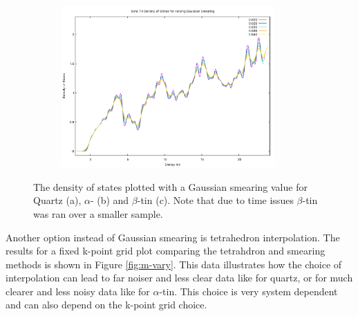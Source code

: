 \documentclass[12pt]{article}
\begin{document}
\begin{figure}[h!!!!!]
	\\
	\begin{subfigure}[t]{0.5\textwidth}
		\includegraphics[width=8.2cm]{beta-dos-data/beta-smear-vary-dos.pdf}
		\label{fig:beta-gs-dos}
	\end{subfigure}
	\caption{The density of states plotted with a Gaussian smearing value for Quartz (a), $\alpha$- (b) and $\beta$-tin (c). Note that due to time issues $\beta$-tin was ran over a smaller sample.}
	\label{fig:gs-vary}
\end{figure}

\noindent Another option instead of Gaussian smearing is tetrahedron interpolation. The results for a fixed k-point grid plot comparing the tetrahdron and smearing methods is shown in Figure \ref{fig:m-vary}. This data illustrates how the choice of interpolation can lead to far noiser and less clear data like for quartz, or for much clearer and less noisy data like for $\alpha$-tin. This choice is very system dependent and can also depend on the k-point grid choice.
\end{document}

